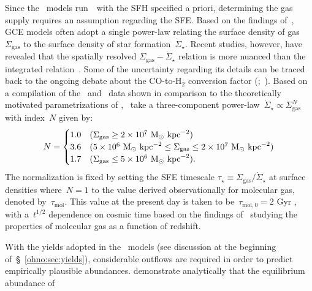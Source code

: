Since the~\citet{Johnson2021} models run~\vice~with the SFH specified a priori,
determining the gas supply requires an assumption regarding the SFE.
Based on the findings of~\citet{Kennicutt1998}, GCE models often adopt a
single power-law relating the surface density of gas~$\Sigma_\text{gas}$ to
the surface density of star formation~$\dot{\Sigma}_\star$.
Recent studies, however, have revealed that the spatially resolved
$\Sigma_\text{gas} - \dot{\Sigma}_\star$ relation is more nuanced than the
integrated relation~\citep{delosReyes2019, Ellison2021, Kennicutt2021}.
Some of the uncertainty regarding its details can be traced back to the
ongoing debate about the CO-to-H$_2$ conversion factor
(\citealp{Kennicutt2012};~\citealp*{Liu2015}).
Based on a compilation of the~\citet{Bigiel2010} and~\citet{Leroy2013} data
shown in comparison to the theoretically motivated parametrizations of
\citet[][see their fig. 2]{Krumholz2018b},~\citet{Johnson2021} take a
three-component power-law~$\dot{\Sigma}_\star \propto \Sigma_\text{gas}^N$ with
index~$N$ given by:
\begin{equation}
N =
\begin{cases}
1.0 & (\Sigma_\text{gas} \geq 2\times10^7~\text{M}_\odot~\text{kpc}^{-2}) \\
3.6 & (5\times10^6~\text{M}_\odot~\text{kpc}^{-2} \leq \Sigma_\text{gas} \leq
2\times10^7~\text{M}_\odot~\text{kpc}^{-2}) \\
1.7 & (\Sigma_\text{gas} \leq 5\times10^6~\text{M}_\odot~\text{kpc}^{-2}).
\end{cases}
\label{ohno:eq:sflaw_indeces}
\end{equation}
The normalization is fixed by setting the SFE timescale
$\tau_\star \equiv \Sigma_\text{gas} / \dot{\Sigma}_\star$ at surface densities
where~$N = 1$ to the value derived observationally for molecular gas, denoted
by~$\tau_\text{mol}$.
This value at the present day is taken to be~$\tau_{\text{mol},0} = 2$ Gyr
\citep{Leroy2008, Leroy2013}, with a~$t^{1/2}$ dependence on cosmic time based
on the findings of~\citet{Tacconi2018} studying the properties of molecular gas
as a function of redshift.
\par
With the yields adopted in the~\citet{Johnson2021} models (see discussion at
the beginning of~\S~\ref{ohno:sec:yields}), considerable outflows are required in
order to predict empirically plausible abundances.
\citet{Weinberg2017b} demonstrate analytically that the equilibrium abundance of
